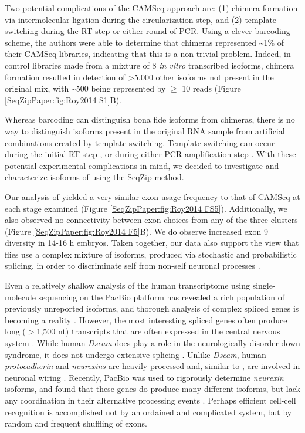 		Two potential complications of the CAMSeq approach are: (1) chimera formation via intermolecular ligation during the circularization step, and (2) template switching during the RT step or either round of PCR. Using a clever barcoding scheme, the authors were able to determine that chimeras represented \textasciitilde1\% of their CAMSeq libraries, indicating that this is a non-trivial problem. Indeed, in control libraries made from a mixture of 8 \textit{in vitro} transcribed \dscam{} isoforms, chimera formation resulted in detection of >5,000 other isoforms not present in the original mix, with \textasciitilde 500 being represented by $\ge$ 10 reads (Figure \ref{SeqZipPaper:fig:Roy2014 S1}B).

		Whereas barcoding can distinguish bona fide isoforms from chimeras, there is no way to distinguish isoforms present in the original RNA sample from artificial combinations created by template switching. Template switching can occur during the initial RT step \citep{Houseley2010a}, or during either PCR amplification step \citep{Meyerhans1990a,Judo1998}. With these potential experimental complications in mind, we decided to investigate and characterize isoforms of \dscam{} using the SeqZip method.

		Our analysis of \dscam{} yielded a very similar exon usage frequency to that of CAMSeq at each stage examined (Figure \ref{SeqZipPaper:fig:Roy2014 FS5}). Additionally, we also observed no connectivity between exon choices from any of the three clusters (Figure \ref{SeqZipPaper:fig:Roy2014 F5}B). We do observe increased exon 9 diversity in 14-16 h embryos. Taken together, our data also support the view that flies use a complex mixture of \dscam{} isoforms, produced via stochastic and probabilistic splicing, in order to discriminate self from non-self neuronal processes \citep{LawrenceZipursky2013}.

		Even a relatively shallow analysis of the human transcriptome using single-molecule sequencing on the PacBio platform has revealed a rich population of previously unreported isoforms, and thorough analysis of complex spliced genes is becoming a reality \citep{Sharon2013}. However, the most interesting spliced genes often produce long ($>$1,500 nt) transcripts that are often expressed in the central nervous system \citep{Park2007}. While human \textit{Dscam} does play a role in the neurologically disorder down syndrome, it does not undergo extensive splicing \citep{Yamakawa1998a}. Unlike \textit{Dscam}, human \textit{protocadherin} and \textit{neurexins} are heavily processed and, similar to \dscam{}, are involved in neuronal wiring \citep{Ushkaryov1992,Wu1999}. Recently, PacBio was used to rigorously determine \textit{neurexin} isoforms, and found that these genes do produce many different isoforms, but lack any coordination in their alternative processing events \citep{Treutlein2014}. Perhaps efficient cell-cell recognition is accomplished not by an ordained and complicated system, but by random and frequent shuffling of exons.

